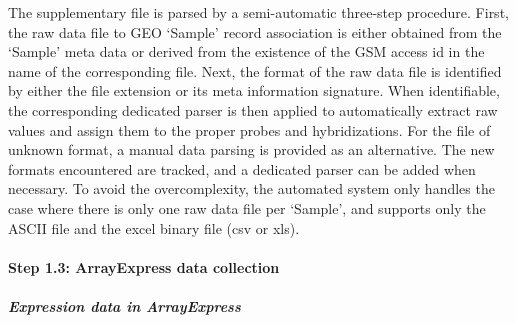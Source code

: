 The supplementary file is parsed by a semi-automatic three-step procedure. First, the raw data file to GEO `Sample' record association is either obtained from the `Sample' meta data or derived from the existence of the GSM access id in the name of the corresponding file. Next, the format of the raw data file is identified by either the file extension or its meta information signature. When identifiable, the corresponding dedicated parser is then applied to automatically extract raw values and assign them to the proper probes and hybridizations. For the file of unknown format, a manual data parsing is provided as an alternative. The new formats encountered are tracked, and a dedicated parser can be added when necessary. To avoid the overcomplexity, the automated system only handles the case where there is only one raw data file per `Sample', and supports only the ASCII file and the excel binary file (csv or xls).








\paragraph{Step 1.3: ArrayExpress data collection}

\subparagraph{Expression data in ArrayExpress}

